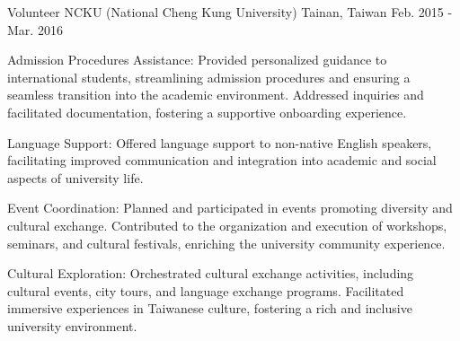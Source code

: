\begin{cventries}
  \cventry
    {Volunteer} %
    {NCKU (National Cheng Kung University)} %
    {Tainan, Taiwan} %
    {Feb. 2015 - Mar. 2016} %
    {
      \begin{cvitems} %
        \item {Admission Procedures Assistance: Provided personalized guidance to international students, streamlining admission procedures and ensuring a seamless transition into the academic environment. Addressed inquiries and facilitated documentation, fostering a supportive onboarding experience.}
        \item {Language Support: Offered language support to non-native English speakers, facilitating improved communication and integration into academic and social aspects of university life.}
        \item {Event Coordination: Planned and participated in events promoting diversity and cultural exchange. Contributed to the organization and execution of workshops, seminars, and cultural festivals, enriching the university community experience.}
        \item {Cultural Exploration: Orchestrated cultural exchange activities, including cultural events, city tours, and language exchange programs. Facilitated immersive experiences in Taiwanese culture, fostering a rich and inclusive university environment.}
      \end{cvitems}
    }

\end{cventries}
